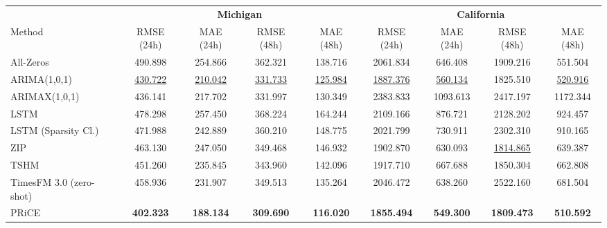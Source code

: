 \begin{tabular}{lcccccccc}
\toprule
& \multicolumn{4}{c}{\textbf{Michigan}} & \multicolumn{4}{c}{\textbf{California}} \\
\cmidrule(lr){2-5} \cmidrule(lr){6-9}
Method & RMSE (24h) & MAE (24h) & RMSE (48h) & MAE (48h) & RMSE (24h) & MAE (24h) & RMSE (48h) & MAE (48h) \\
\midrule
All-Zeros & 490.898 & 254.866 & 362.321 & 138.716 & 2061.834 & 646.408 & 1909.216 & 551.504 \\
ARIMA(1,0,1) & \underline{430.722} & \underline{210.042} & \underline{331.733} & \underline{125.984} & \underline{1887.376} & \underline{560.134} & 1825.510 & \underline{520.916} \\
ARIMAX(1,0,1) & 436.141 & 217.702 & 331.997 & 130.349 & 2383.833 & 1093.613 & 2417.197 & 1172.344 \\
LSTM & 478.298 & 257.450 & 368.224 & 164.244 & 2109.166 & 876.721 & 2128.202 & 924.457 \\
LSTM (Sparsity Cl.) & 471.988 & 242.889 & 360.210 & 148.775 & 2021.799 & 730.911 & 2302.310 & 910.165 \\
ZIP & 463.130 & 247.050 & 349.468 & 146.932 & 1902.870 & 630.093 & \underline{1814.865} & 639.387 \\
TSHM & 451.260 & 235.845 & 343.960 & 142.096 & 1917.710 & 667.688 & 1850.304 & 662.808 \\
TimesFM 3.0 (zero-shot) & 458.936 & 231.907 & 349.513 & 135.264 & 2046.472 & 638.260 & 2522.160 & 681.504 \\
PRiCE & \textbf{402.323} & \textbf{188.134} & \textbf{309.690} & \textbf{116.020} & \textbf{1855.494} & \textbf{549.300} & \textbf{1809.473} & \textbf{510.592} \\
\bottomrule
\end{tabular}
